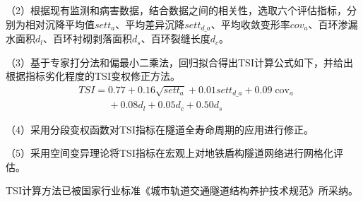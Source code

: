 （2）根据现有监测和病害数据，结合数据之间的相关性，选取六个评估指标，分别为相对沉降平均值${sett}_{a}$、平均差异沉降$set{{t}_{d\_a}}$、平均收敛变形率${cov}_{a}$、百环渗漏水面积${d}_{l}$、百环衬砌剥落面积${d}_{s}$、百环裂缝长度${d}_{c}$。

（3）基于专家打分法和偏最小二乘法，回归拟合得出TSI计算公式如下，并给出根据指标劣化程度的TSI变权修正方法。
\begin{align}
  & TSI=0.77+0.16\sqrt{set{{t}_{a}}}+0.01set{{t}_{d\_a}}+0.09{{\operatorname{cov}}_{a}} \nonumber \\ 
 & \quad \quad \quad +0.08{{d}_{l}}+0.05{{d}_{c}}+0.50{{d}_{s}} \nonumber 
\end{align}

（4）采用分段变权函数对TSI指标在隧道全寿命周期的应用进行修正。

（5）采用空间变异理论将TSI指标在宏观上对地铁盾构隧道网络进行网格化评估。

TSI计算方法已被国家行业标准《城市轨道交通隧道结构养护技术规范》所采纳。

